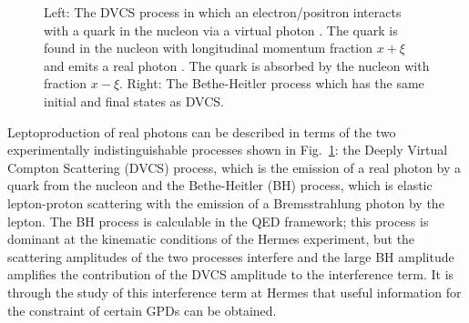\begin{figure}
\begin{center}
\hspace{3cm}
\caption[DVCS and Bethe Heitler hand bag diagram.]{Left: The DVCS process in
which an electron/positron interacts with a quark in the nucleon  via a virtual photon \blue{$\gamma^\ast$)}. The quark is found in the nucleon with longitudinal momentum fraction $x+\xi$ and emits a real photon \blue{($\gamma$)}. The quark is absorbed by the nucleon with fraction $x-\xi$. Right: The Bethe-Heitler process which has the same initial and final states as DVCS.}
\label{spin}
\end{center}
\end{figure}

Leptoproduction of real photons  can be described in terms of the two experimentally indistinguishable processes shown in Fig.~\ref{spin}: the Deeply Virtual Compton Scattering (DVCS) process, which is the
emission of a real photon by a quark from the nucleon\blue{,} and the Bethe-Heitler (BH) process, which is elastic lepton-proton scattering with the
emission of a Bremsstrahlung photon by the lepton. 
The BH process is calculable in the QED framework; this process is
dominant at the kinematic conditions of the H{\sc ermes} experiment, but the
scattering amplitudes of the two processes interfere and the large BH amplitude
amplifies the contribution of the DVCS amplitude to the interference term. 
It is through the study of this interference term at H{\sc ermes} that
useful information for the constraint of certain GPDs can be obtained.

